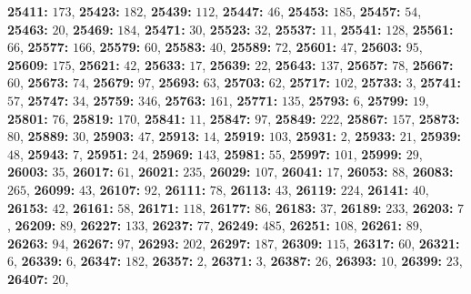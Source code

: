 \textsf{\bfseries 25411:} $173$, \textsf{\bfseries 25423:} $182$, \textsf{\bfseries 25439:} $112$, \textsf{\bfseries 25447:} $46$, \textsf{\bfseries 25453:} $185$, \textsf{\bfseries 25457:} $54$, \textsf{\bfseries 25463:} $20$, \textsf{\bfseries 25469:} $184$, \textsf{\bfseries 25471:} $30$, \textsf{\bfseries 25523:} $32$, \textsf{\bfseries 25537:} $11$, \textsf{\bfseries 25541:} $128$, \textsf{\bfseries 25561:} $66$, \textsf{\bfseries 25577:} $166$, \textsf{\bfseries 25579:} $60$, \textsf{\bfseries 25583:} $40$, \textsf{\bfseries 25589:} $72$, \textsf{\bfseries 25601:} $47$, \textsf{\bfseries 25603:} $95$, \textsf{\bfseries 25609:} $175$, \textsf{\bfseries 25621:} $42$, \textsf{\bfseries 25633:} $17$, \textsf{\bfseries 25639:} $22$, \textsf{\bfseries 25643:} $137$, \textsf{\bfseries 25657:} $78$, \textsf{\bfseries 25667:} $60$, \textsf{\bfseries 25673:} $74$, \textsf{\bfseries 25679:} $97$, \textsf{\bfseries 25693:} $63$, \textsf{\bfseries 25703:} $62$, \textsf{\bfseries 25717:} $102$, \textsf{\bfseries 25733:} $3$, \textsf{\bfseries 25741:} $57$, \textsf{\bfseries 25747:} $34$, \textsf{\bfseries 25759:} $346$, \textsf{\bfseries 25763:} $161$, \textsf{\bfseries 25771:} $135$, \textsf{\bfseries 25793:} $6$, \textsf{\bfseries 25799:} $19$, \textsf{\bfseries 25801:} $76$, \textsf{\bfseries 25819:} $170$, \textsf{\bfseries 25841:} $11$, \textsf{\bfseries 25847:} $97$, \textsf{\bfseries 25849:} $222$, \textsf{\bfseries 25867:} $157$, \textsf{\bfseries 25873:} $80$, \textsf{\bfseries 25889:} $30$, \textsf{\bfseries 25903:} $47$, \textsf{\bfseries 25913:} $14$, \textsf{\bfseries 25919:} $103$, \textsf{\bfseries 25931:} $2$, \textsf{\bfseries 25933:} $21$, \textsf{\bfseries 25939:} $48$, \textsf{\bfseries 25943:} $7$, \textsf{\bfseries 25951:} $24$, \textsf{\bfseries 25969:} $143$, \textsf{\bfseries 25981:} $55$, \textsf{\bfseries 25997:} $101$, \textsf{\bfseries 25999:} $29$, \textsf{\bfseries 26003:} $35$, \textsf{\bfseries 26017:} $61$, \textsf{\bfseries 26021:} $235$, \textsf{\bfseries 26029:} $107$, \textsf{\bfseries 26041:} $17$, \textsf{\bfseries 26053:} $88$, \textsf{\bfseries 26083:} $265$, \textsf{\bfseries 26099:} $43$, \textsf{\bfseries 26107:} $92$, \textsf{\bfseries 26111:} $78$, \textsf{\bfseries 26113:} $43$, \textsf{\bfseries 26119:} $224$, \textsf{\bfseries 26141:} $40$, \textsf{\bfseries 26153:} $42$, \textsf{\bfseries 26161:} $58$, \textsf{\bfseries 26171:} $118$, \textsf{\bfseries 26177:} $86$, \textsf{\bfseries 26183:} $37$, \textsf{\bfseries 26189:} $233$, \textsf{\bfseries 26203:} $7$, \textsf{\bfseries 26209:} $89$, \textsf{\bfseries 26227:} $133$, \textsf{\bfseries 26237:} $77$, \textsf{\bfseries 26249:} $485$, \textsf{\bfseries 26251:} $108$, \textsf{\bfseries 26261:} $89$, \textsf{\bfseries 26263:} $94$, \textsf{\bfseries 26267:} $97$, \textsf{\bfseries 26293:} $202$, \textsf{\bfseries 26297:} $187$, \textsf{\bfseries 26309:} $115$, \textsf{\bfseries 26317:} $60$, \textsf{\bfseries 26321:} $6$, \textsf{\bfseries 26339:} $6$, \textsf{\bfseries 26347:} $182$, \textsf{\bfseries 26357:} $2$, \textsf{\bfseries 26371:} $3$, \textsf{\bfseries 26387:} $26$, \textsf{\bfseries 26393:} $10$, \textsf{\bfseries 26399:} $23$, \textsf{\bfseries 26407:} $20$, 

